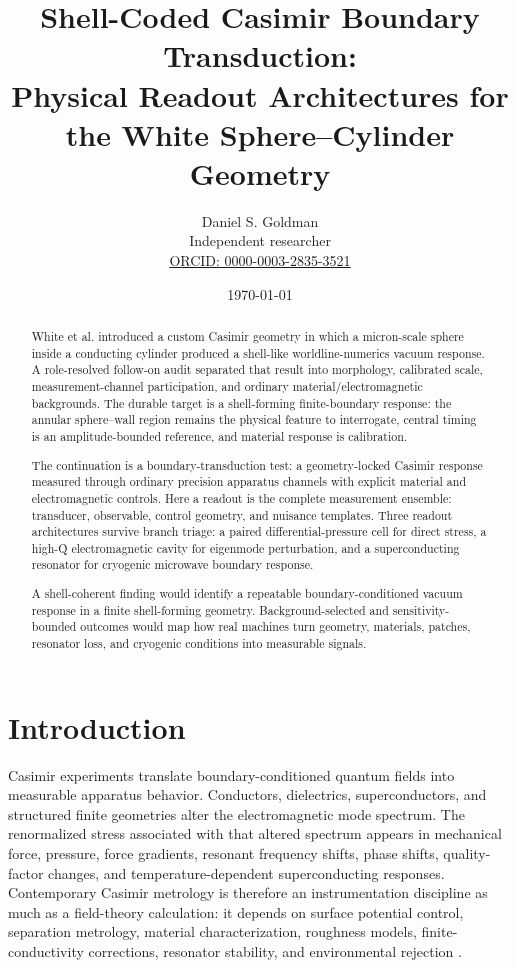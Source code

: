 \documentclass[11pt]{article}
\title{\bfseries Shell-Coded Casimir Boundary Transduction:\\
Physical Readout Architectures for the White Sphere--Cylinder Geometry}
\author{
Daniel S. Goldman\\
Independent researcher\\
\href{https://orcid.org/0000-0003-2835-3521}{ORCID: 0000-0003-2835-3521}
}
\date{\today}
\begin{document}
\maketitle

\begin{abstract}
White et al. introduced a custom Casimir geometry in which a micron-scale
sphere inside a conducting cylinder produced a shell-like worldline-numerics
vacuum response. A role-resolved follow-on audit separated that result into
morphology, calibrated scale, measurement-channel participation, and ordinary
material/electromagnetic backgrounds. The durable target is a shell-forming
finite-boundary response: the annular sphere--wall region remains the physical
feature to interrogate, central timing is an amplitude-bounded reference, and
material response is calibration.

The continuation is a boundary-transduction test: a geometry-locked Casimir
response measured through ordinary precision apparatus channels with explicit
material and electromagnetic controls. Here a readout is the complete
measurement ensemble: transducer, observable, control geometry, and nuisance
templates. Three readout architectures survive branch triage: a paired
differential-pressure cell for direct stress, a high-Q electromagnetic cavity
for eigenmode perturbation, and a superconducting resonator for cryogenic
microwave boundary response.

A shell-coherent finding would identify a repeatable boundary-conditioned
vacuum response in a finite shell-forming geometry. Background-selected and
sensitivity-bounded outcomes would map how real machines turn geometry,
materials, patches, resonator loss, and cryogenic conditions into measurable
signals.
\end{abstract}

\section{Introduction}

Casimir experiments translate boundary-conditioned quantum fields into
measurable apparatus behavior. Conductors, dielectrics, superconductors, and
structured finite geometries alter the electromagnetic mode spectrum. The
renormalized stress associated with that altered spectrum appears in
mechanical force, pressure, force gradients, resonant frequency shifts, phase
shifts, quality-factor changes, and temperature-dependent superconducting
responses. Contemporary Casimir metrology is therefore an instrumentation
discipline as much as a field-theory calculation: it depends on surface
potential control, separation metrology, material characterization, roughness
models, finite-conductivity corrections, resonator stability, and
environmental rejection \cite{Lamoreaux1997,MohideenRoy1998,Decca2011,
Bimonte2021,GarciaSanchez2012,Stange2019,Behunin2011,Garrett2015}.
\end{document}
